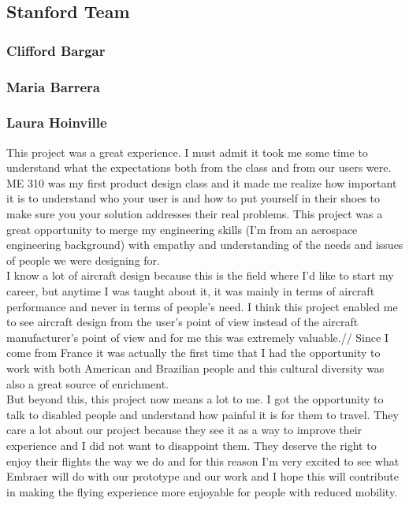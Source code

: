 \subsection{Stanford Team}

\subsubsection{Clifford Bargar}

\subsubsection{Maria Barrera}

\subsubsection{Laura Hoinville}

This project was a great experience. I must admit it took me some time to understand what the expectations both from the class and from our users were. ME 310 was my first product design class and it made me realize how important it is to understand who your user is and how to put yourself in their shoes to make sure you your solution addresses their real problems. This project was a great opportunity to merge my engineering skills (I’m from an aerospace engineering background) with empathy and understanding of the needs and issues of people we were designing for.\\

I know a lot of aircraft design because this is the field where I’d like to start my career, but anytime I was taught about it, it was mainly in terms of aircraft performance and never in terms of people’s need. I think this project enabled me to see aircraft design from the user’s point of view instead of the aircraft manufacturer’s point of view and for me this was extremely valuable.//
Since I come from France it was actually the first time that I had the opportunity to work with both American and Brazilian people and this cultural diversity was also a great source of enrichment.\\

But beyond this, this project now means a lot to me. I got the opportunity to talk to disabled people and understand how painful it is for them to travel. They care a lot about our project because they see it as a way to improve their experience and I did not want to disappoint them. They deserve the right to enjoy their flights the way we do and for this reason I’m very excited to see what Embraer will do with our prototype and our work and I hope this will contribute in making the flying experience more enjoyable for people with reduced mobility. 


